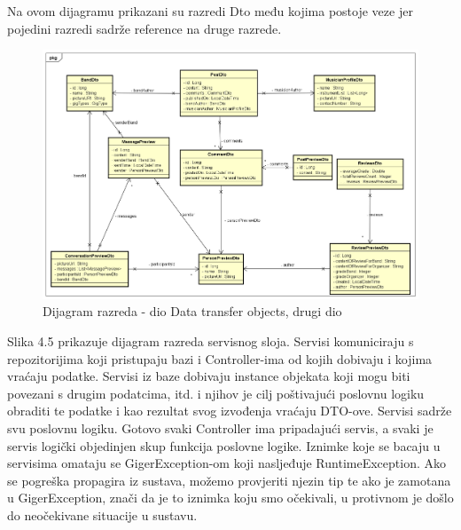 		Na ovom dijagramu prikazani su razredi Dto među kojima postoje veze jer pojedini razredi sadrže reference na druge razrede. 
		
		\begin{figure}[H]
			\begin{center}
				\includegraphics[width=17cm]{slike/povezani_dto.PNG}
			\end{center}
			\caption{Dijagram razreda - dio Data transfer objects, drugi dio}
			\label{fig:dto2}
		\end{figure}
		
		Slika 4.5 prikazuje dijagram razreda servisnog sloja. Servisi komuniciraju s repozitorijima koji pristupaju bazi i Controller-ima od kojih dobivaju i kojima vraćaju podatke. Servisi iz baze dobivaju instance objekata koji mogu biti povezani s drugim podatcima, itd. i njihov je cilj poštivajući poslovnu logiku obraditi te podatke i kao rezultat svog izvođenja vraćaju DTO-ove. Servisi sadrže svu poslovnu logiku. Gotovo svaki Controller ima pripadajući servis, a svaki je servis logički objedinjen skup funkcija poslovne logike. Iznimke koje se bacaju u servisima omataju se GigerException-om koji nasljeđuje RuntimeException. Ako se pogreška propagira iz sustava, možemo provjeriti njezin tip te ako je zamotana u GigerException, znači da je to iznimka koju smo očekivali, u protivnom je došlo do neočekivane situacije u sustavu.
		
